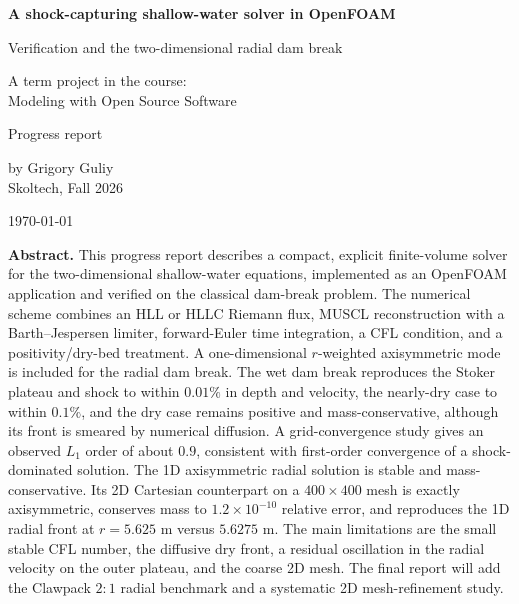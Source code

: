 ﻿\documentclass[11pt,a4paper]{article}
\newcommand{\studentname}{Grigory Guliy} %
\begin{document}
\begin{titlepage}
\centering
\vspace*{2.2cm}
{\LARGE\bfseries A shock-capturing shallow-water solver in OpenFOAM\par}
\vspace{0.5cm}
{\Large Verification and the two-dimensional radial dam break\par}
\vspace{2.2cm}
{\large A term project in the course:\\[2pt]
Modeling with Open Source Software\par}
\vspace{1.2cm}
{\large Progress report\par}
\vspace{2.2cm}
{\large by \studentname\\[2pt]
Skoltech, Fall 2026\par}
\vfill
{\large \today\par}
\end{titlepage}

\thispagestyle{fancy}

\noindent\textbf{Abstract.}
This progress report describes a compact, explicit finite-volume solver for the
two-dimensional shallow-water equations, implemented as an OpenFOAM
application and verified on the classical dam-break problem.  The numerical
scheme combines an HLL or HLLC Riemann flux, MUSCL reconstruction with a
Barth--Jespersen limiter, forward-Euler time integration, a CFL condition, and
a positivity/dry-bed treatment.  A one-dimensional $r$-weighted axisymmetric
mode is included for the radial dam break.  The wet dam break reproduces the
Stoker plateau and shock to within $0.01\%$ in depth and velocity, the
nearly-dry case to within $0.1\%$, and the dry case remains positive and
mass-conservative, although its front is smeared by numerical diffusion.  A
grid-convergence study gives an observed $L_1$ order of about $0.9$, consistent
with first-order convergence of a shock-dominated solution.  The 1D
axisymmetric radial solution is stable and mass-conservative.  Its 2D
Cartesian counterpart on a $400\times400$ mesh is exactly axisymmetric,
conserves mass to $1.2\times10^{-10}$ relative error, and reproduces the 1D
radial front at $r=5.625$ m versus $5.6275$ m.  The main limitations are the
small stable CFL number, the diffusive dry front, a residual oscillation in the
radial velocity on the outer plateau, and the coarse 2D mesh.  The final report
will add the Clawpack $2:1$ radial benchmark and a systematic 2D mesh-refinement
study.
\end{document}
